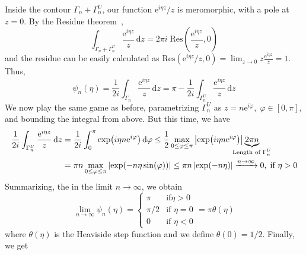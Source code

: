 Inside the contour \(\Gamma _n + \Gamma_n^U\), our function \(\mathrm{e}^{i \eta z}/z \) is meromorphic, with
a pole at \(z=0\).  By the Residue theorem~\autocite{Byron1992, Rudin1987},
\begin{equation}
    \int_{\Gamma _n+\Gamma _n^U} \frac{\mathrm{e}^{i \eta z} }{z}\,\mathrm{d}z = 2 \pi  i\; \mathrm{Res} \left( \frac{\mathrm{e}^{i \eta z}}{z}, 0 \right)
\end{equation}
and the residue can be easily calculated as \(\mathrm{Res} \left( \mathrm{e}^{i \eta z}/z, 0 \right) =
\lim_{z \to 0} z \frac{\mathrm{e}^{i \eta z}}{z} = 1\). Thus,
\begin{equation}
    \psi_n(\eta ) = \frac{1}{2i}\int_{\Gamma _n} \frac{\mathrm{e}^{i \eta  z} }{z} \,\mathrm{d}z = \pi - \frac{1}{2i} \int_{\Gamma _n^U} \frac{\mathrm{e}^{i \eta z}}{z}\,\mathrm{d}z
\end{equation}
We now play the same game as before, parametrizing \(\Gamma _n^U\) as \(z = n \mathrm{e}^{i \varphi },\; \varphi  \in \left[ 0, \pi  \right]  \), and
bounding the integral from above. But this time, we have
\begin{align}
    \frac{1}{2i} \int_{\Gamma _n^U} \frac{\mathrm{e}^{i \eta z}}{z}\,\mathrm{d}z & = \frac{1}{2i} \int_{0}^{\pi } \exp({i \eta n \mathrm{e}^{i \varphi } }) \,\mathrm{d}\varphi
    \leq \frac{1}{2} \max_{0 \leq \varphi \leq \pi } \abs{\exp ( i \eta n \mathrm{e}^{i \varphi } ) } \underbrace{2 \pi  n}_{\mathclap{\text{Length of }\Gamma _n^U}} \nonumber                                                                                                            \\
                                                                                 & = \pi  n \max_{0 \leq \varphi \leq \pi } \left\vert \exp (-n \eta \sin (\varphi )) \right\vert \leq \pi  n \left\vert \exp (-n \eta ) \right\vert \xrightarrow{n\to \infty } 0, \; \text{if } \eta  > 0
\end{align}
Summarizing, the in the limit \(n \to \infty \), we obtain
\begin{equation}
    \lim_{n \to \infty}  \psi _n(\eta ) = \begin{cases}
        \pi    & \text{if} \eta > 0   \\
        \pi /2 & \text{if } \eta  = 0 \\
        0      & \text{if } \eta  < 0
    \end{cases}
    = \pi \theta (\eta )
\end{equation}
where \(\theta (\eta )\) is the Heaviside step function and we define \(\theta (0) = 1/2\).  Finally, we get
